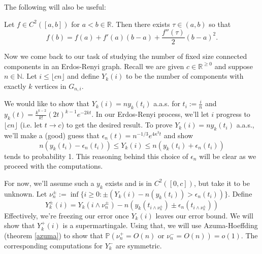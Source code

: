 
The following will also be useful:

\begin{theorem}
    \label{taylor}
    Let \(f \in C^{2}([a, b])\) for \(a < b \in \mathbb{R}\). Then there exists \(\tau \in (a, b)\) so that
    \[f(b) = f(a) + f'(a)(b-a) + \frac{f''(\tau)}{2}(b-a)^{2}.\]
\end{theorem}

Now we come back to our task of studying the number of fixed size connected components in an Erdos-Renyi graph. Recall we are given \(c \in
\mathbb{R}^{\geq 0}\) and suppose \(n \in \mathbb{N}\). Let \(i \leq \lfloor {cn} \rfloor\) and define \(Y_{k}(i)\) to be the number of components with exactly \(k\) vertices in \(G_{n, i}\).

We would like to show that \(Y_{k}(i) = n y_{k}(t_{i})\) a.a.s. for \(t_{i} := \frac{i}{n}\) and \(y_{k}(t) = \frac{k^{k-2}}{k!}(2t)^{k-1} e^{-2kt}\). In our Erdos-Renyi process, we'll let \(i\) progress to \(\lfloor {cn} \rfloor\) (i.e. let \(t \to c\)) to get the desired result. To prove \(Y_{k}(i) = n y_{k}(t_{i})\) a.a.s., we'll make a (good) guess that \(\epsilon_{n}(t) = n^{-1/3} e^{4 \kappa^{3} t}\) and show
\[n(y_{k}(t_{i}) - \epsilon_{n}(t_{i})) \leq Y_{k}(i) \leq n(y_{k}(t_{i}) + \epsilon_{n}(t_{i}))\]
tends to probability 1. This reasoning behind this choice of \(\epsilon_{n}\) will be clear as we proceed with the computations.

For now, we'll assume such a \(y_{k}\) exists and is in \(C^{2}([0, c])\), but take it to be unknown. Let \(\nu_{n}^{\pm} := \inf\limits \{i \geq 0 : \pm (Y_{k}(i) - n(y_{k}(t_{i})) > \epsilon_{n}(t_{i}))\}\). Define
\[Y_{k}^{\pm}(i) = Y_{k}(i \wedge \nu_{n}^{\pm}) - n(y_{k}(t_{i \wedge \nu_{n}^{\pm}}) \pm \epsilon_{n}(t_{i \wedge \nu_{n}^{\pm}})) \]
Effectively, we're freezing our error once \(Y_{k}(i)\) leaves our error bound. We will show that \(Y_{k}^{+}(i)\) is a supermartingale. Using that, we will use Azuma-Hoeffding (theorem \ref{azuma}) to show that \(\mathbb{P}(\nu_{n}^{+} = O(n) \text{ or } \nu_{n}^{-} = O(n)) = o(1)\). The corresponding computations for \(Y_{k}^{-}\) are symmetric.

